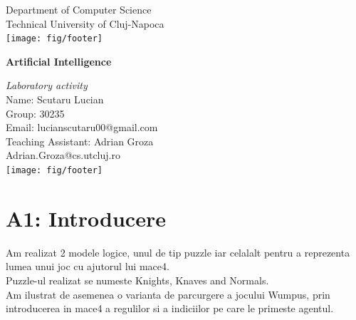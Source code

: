 \documentclass[a4paper,12pt]{report}
\begin{document}
\vspace{-5cm}
\begin{center}
Department of Computer Science\\
Technical University of Cluj-Napoca\\
\texttt{[image: fig/footer]}
\end{center}
\vspace{1cm}
\begin{center}
\begin{Large}
 \textbf{Artificial Intelligence}\\
\end{Large}
\textit{Laboratory activity}\\
\vspace{3cm}
Name: Scutaru Lucian\\
Group: 30235\\
Email: lucianscutaru00@gmail.com\\
\vspace{12cm}
Teaching Assistant: Adrian Groza\\
Adrian.Groza@cs.utcluj.ro\\
\vspace{1cm}
\texttt{[image: fig/footer]}
\end{center}

\tableofcontents




\chapter{A1: Introducere}
Am realizat 2 modele logice, unul de tip puzzle iar celalalt pentru a reprezenta lumea unui joc cu ajutorul lui mace4.\\
Puzzle-ul realizat se numeste Knights, Knaves and Normals.\\
Am ilustrat de asemenea o varianta de parcurgere a jocului Wumpus, prin introducerea in mace4 a regulilor si a indiciilor pe care le primeste agentul.
\end{document}
